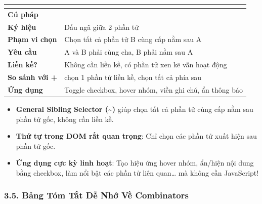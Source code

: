 \begin{prettyTableBox}
\sffamily\small
\begin{tabularx}{\linewidth}{|>{\bfseries\color{primaryBlue}}K{3.5cm}|Z|}
\hline
{}  &  \\
\hline
Cú pháp &  \\
\hline
Ký hiệu & Dấu ngã \codeinline{\textasciitilde{}} giữa 2 phần tử \\
\hline
Phạm vi chọn & Chọn tất cả phần tử B cùng cấp nằm sau A \\
\hline
Yêu cầu & A và B phải cùng cha, B phải nằm sau A \\
\hline
Liền kề? & Không cần liền kề, có phần tử xen kẽ vẫn hoạt động \\
\hline
So sánh với + & \codeinline{+} chọn 1 phần tử liền kề, \codeinline{\textasciitilde{}} chọn tất cả phía sau \\
\hline
Ứng dụng & Toggle checkbox, hover nhóm, viền ghi chú, ẩn thông báo \\
\hline
\end{tabularx}
\end{prettyTableBox}

\begin{tipBox}
\begin{itemize}[leftmargin=1.5em, itemsep=3pt, parsep=0pt]
    \item \textbf{General Sibling Selector (\textasciitilde{})} giúp chọn tất cả phần tử cùng cấp nằm sau phần tử gốc, không cần liền kề.
    \item \textbf{Thứ tự trong DOM rất quan trọng}: Chỉ chọn các phần tử xuất hiện sau phần tử gốc.
    \item \textbf{Ứng dụng cực kỳ linh hoạt}: Tạo hiệu ứng hover nhóm, ẩn/hiện nội dung bằng checkbox, làm nổi bật các phần tử liên quan\ldots{} mà không cần JavaScript!
\end{itemize}
\end{tipBox}

\subsubsection{3.5. Bảng Tóm Tắt Dễ Nhớ Về Combinators}

